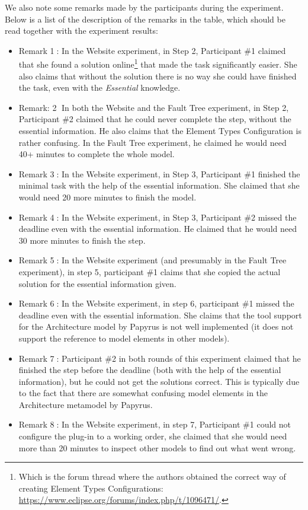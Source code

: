 We also note some remarks made by the participants during the experiment.
Below is a list of the description of the remarks in the table, which should be read together with the experiment results:
\begin{itemize}
	\item Remark \textcircled{1}: In the Website experiment, in Step 2, Participant \#1 claimed that she found a solution online\footnote{Which is the forum thread where the authors obtained the correct way of creating Element Types Configurations: \url{https://www.eclipse.org/forums/index.php/t/1096471/}.} that made the task significantly easier. 
	She also claims that without the solution there is no way she could have finished the task, even with the \textit{Essential} knowledge.
	\item Remark: \textcircled{2} In both the Website and the Fault Tree experiment, in Step 2, Participant \#2 claimed that he could never complete the step, without the essential information. 
	He also claims that the Element Types Configuration is rather confusing.
	In the Fault Tree experiment, he claimed he would need 40+ minutes to complete the whole model.
	\item Remark \textcircled{3}: In the Website experiment, in Step 3, Participant  \#1 finished the minimal task with the help of the essential information. She	claimed that she would need 20 more minutes to finish the model.
	\item Remark \textcircled{4}: In the Website experiment, in Step 3, Participant  \#2 missed the deadline even with the essential information.
	He claimed that he would need 30 more minutes to finish the step.
	\item Remark \textcircled{5}: In the Website experiment (and presumably in the Fault Tree experiment), in step 5, participant  \#1 claims that she copied the actual solution for the essential information given.
	\item Remark \textcircled{6}: In the Website experiment, in step 6, participant  \#1 missed the deadline even with the essential information. 
	She claims that the tool support for the Architecture model by Papyrus is not well implemented (it does not support the reference to model elements in other models).
	\item Remark \textcircled{7}: Participant  \#2 in both rounds of this experiment claimed that he finished the step before the deadline (both with the help of the essential information), but he could not get the solutions correct. 
	This is typically due to the fact that there are somewhat confusing model elements in the Architecture metamodel by Papyrus.
	\item Remark \textcircled{8}: In the Website experiment, in step 7, Participant  \#1 could not configure the plug-in to a working order, she claimed that she would need more than 20 minutes to inspect other models to find out what went wrong.
\end{itemize}
